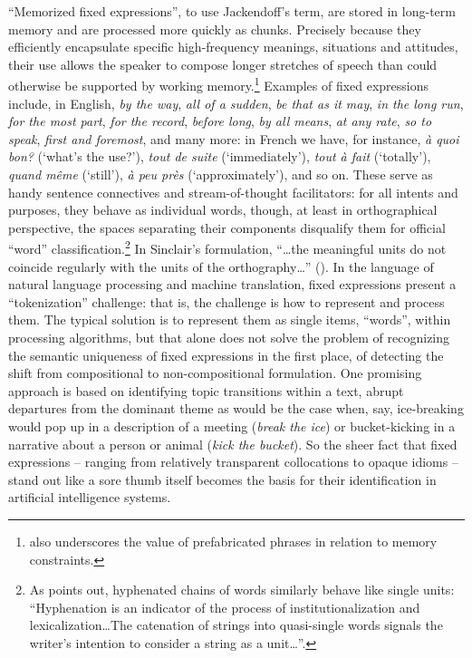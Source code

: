 \documentclass[english,output=paper,colorlinks,citecolor=brown]{../langscibook}
\begin{document}
``Memorized fixed expressions'', to use Jackendoff’s term, are stored in long-term memory and are processed more quickly as chunks. Precisely because they efficiently encapsulate specific high-frequency meanings, situations and attitudes, their use allows the speaker to compose longer stretches of speech than could otherwise be supported by working memory.\footnote{\citet{Bolinger1976} also underscores the value of prefabricated phrases in relation to memory constraints.} Examples of fixed expressions include, in English, \textit{by the way}, \textit{all of a sudden}, \textit{be that as it may}, \textit{in the long run}, \textit{for the most part}, \textit{for the record}, \textit{before long}, \textit{by all means}, \textit{at any rate}, \textit{so to speak}, \textit{first and foremost}, and many more: in French we have, for instance, \textit{à quoi bon?} (`what’s the use?'), \textit{tout de suite} (`immediately'), \textit{tout à fait} (`totally'), \textit{quand même} (`still'), \textit{à peu près} (`approximately'), and so on. These serve as handy sentence connectives and stream-of-thought facilitators: for all intents and purposes, they behave as individual words, though, at least in orthographical perspective, the spaces separating their components disqualify them for official ``word'' classification.\footnote{As \citet[43]{Moon1998} points out, hyphenated chains of words similarly behave like single units: “Hyphenation is an indicator of the process of institutionalization and lexicalization…The catenation of strings into quasi-single words signals the writer’s intention to consider a string as a unit…”.} In Sinclair’s formulation, “…the meaningful units do not coincide regularly with the units of the orthography…” (\citeyear[410]{Sinclair2008}). In the language of natural language processing and machine translation, fixed expressions present a ``tokenization'' challenge: that is, the challenge is how to represent and process them. The typical solution is to represent them as single items, ``words'', within processing algorithms, but that alone does not solve the problem of recognizing the semantic uniqueness of fixed expressions in the first place, of detecting the shift from compositional to non-compositional formulation. One promising approach is based on identifying topic transitions within a text, abrupt departures from the dominant theme as would be the case when, say, ice-breaking would pop up in a description of a meeting (\textit{break the ice}) or bucket-kicking in a narrative about a person or animal (\textit{kick the bucket}). So the sheer fact that fixed expressions – ranging from relatively transparent collocations to opaque idioms – stand out like a sore thumb itself becomes the basis for their identification in artificial intelligence systems.
\end{document}
